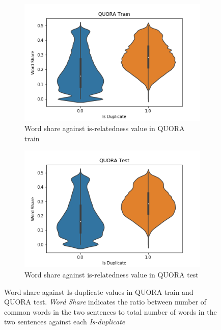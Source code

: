 \begin{enumerate}
\begin{figure}
	\captionsetup[subfigure]{justification=centering}
	\centering
	\begin{subfigure}[b]{.5\textwidth}
		\centering
		\includegraphics[width=\textwidth]{figures/semantic_textual_similarity/introduction/quora_train_word_share.png}
		\caption{Word share against is-relatedness value in QUORA train}
		\label{fig:quora_train_word_share}
	\end{subfigure}%
	\begin{subfigure}[b]{.5\textwidth}
		\centering
		\includegraphics[width=\textwidth]{figures/semantic_textual_similarity/introduction/quora_test_word_share.png}
		\caption{Word share against is-relatedness value in QUORA test}
		\label{fig:quora_test_word_share}
	\end{subfigure}
	\caption[Word share against Is-duplicate values in QUORA train and QUORA test.]{Word share against Is-duplicate values in QUORA train and QUORA test. \textit{Word Share} indicates the ratio between number of common words in the two sentences to total number of words in the two sentences against each \textit{Is-duplicate}}
	\label{fig:quora_word_share}
\end{figure}



\end{enumerate}
